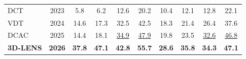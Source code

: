 \documentclass[border=4pt]{standalone}
\begin{document}
\begin{tabular}{l c cccc cccc}
            DCT & 2023
            & 5.8 & 6.2 & 12.6 & 20.2
            & 10.4 & 12.1 & 12.8 & 22.1 \\

            VDT & 2024
            & 14.6 & 17.3 & 32.5 & 42.5
            & 18.3 & 21.4 & 26.4 & 37.6 \\

            DCAC & 2025
            & 14.4 & 18.1 & \underline{34.9} & \underline{47.9}
            & 19.8 & 23.5 & \underline{32.6} & \underline{46.8} \\

            \midrule

            \textbf{3D-LENS}
            & \textbf{2026} & \textbf{37.8} & \textbf{47.1} & \textbf{42.8} & \textbf{55.7}
            & \textbf{28.6} & \textbf{35.8} & \textbf{34.3} & \textbf{47.1} \\

            \bottomrule
        \end{tabular}
\end{document}
